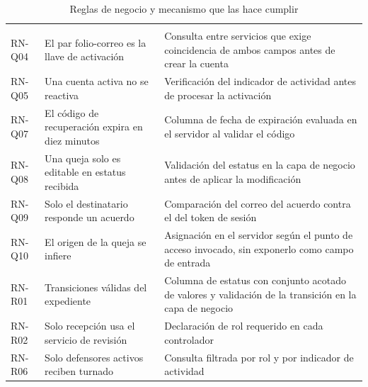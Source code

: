 	\begin{longtable}{|p{1.9cm}|p{5.6cm}|p{6.6cm}|}
		\caption{Reglas de negocio y mecanismo que las hace cumplir}
		\label{tab:reglas_mecanismos} \\
		\hline
		\rowcolor{headerblue}
		\headercell{Regla} & \headercell{Enunciado} & \headercell{Mecanismo} \\
		\hline
		\endfirsthead
	
		\hline
		\rowcolor{headerblue}
		\headercell{Regla} & \headercell{Enunciado} & \headercell{Mecanismo} \\
		\hline
		\endhead
	
		RN-Q04 & El par folio-correo es la llave de activación & Consulta entre servicios que exige
		coincidencia de ambos campos antes de crear la cuenta \\ \hline
	
		RN-Q05 & Una cuenta activa no se reactiva & Verificación del indicador de actividad antes de
		procesar la activación \\ \hline
	
		RN-Q07 & El código de recuperación expira en diez minutos & Columna de fecha de expiración
		evaluada en el servidor al validar el código \\ \hline
	
		RN-Q08 & Una queja solo es editable en estatus recibida & Validación del estatus en la capa
		de negocio antes de aplicar la modificación \\ \hline
	
		RN-Q09 & Solo el destinatario responde un acuerdo & Comparación del correo del acuerdo contra
		el del token de sesión \\ \hline
	
		RN-Q10 & El origen de la queja se infiere & Asignación en el servidor según el punto de acceso
		invocado, sin exponerlo como campo de entrada \\ \hline
	
		RN-R01 & Transiciones válidas del expediente & Columna de estatus con conjunto acotado de
		valores y validación de la transición en la capa de negocio \\ \hline
	
		RN-R02 & Solo recepción usa el servicio de revisión & Declaración de rol requerido en cada
		controlador \\ \hline
	
		RN-R06 & Solo defensores activos reciben turnado & Consulta filtrada por rol y por indicador
		de actividad \\ \hline
	

\end{longtable}

